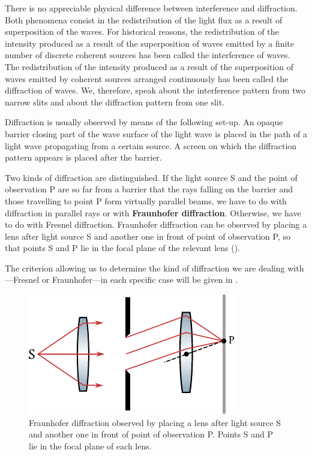 There is no appreciable physical difference between interference and diffraction.
Both phenomena consist in the redistribution of the light flux as a result of superposition of the waves.
For historical reasons, the redistribution of the intensity produced as a result of the superposition of waves emitted by a finite number of discrete coherent sources has been called the interference of waves.
The redistribution of the intensity produced as a result of the superposition of waves emitted by coherent sources arranged continuously has been called the diffraction of waves.
We, therefore, speak about the interference pattern from two narrow slits and about the diffraction pattern from one slit.

Diffraction is usually observed by means of the following set-up.
An opaque barrier closing part of the wave surface of the light wave is placed in the path of a light wave propagating from a certain source.
A screen on which the diffraction pattern appears is placed after the barrier.

Two kinds of diffraction are distinguished.
If the light source S and the point of observation P are so far from a barrier that the rays falling on the barrier and those travelling to point P form virtually parallel beams, we have to do with diffraction in parallel rays or with \textbf{Fraunhofer diffraction}.
Otherwise, we have to do with Fresnel diffraction.
Fraunhofer diffraction can be observed by placing a lens after light source S and another one in front of point of observation P, so that points S and P lie in the focal plane of the relevant lens
().

The criterion allowing us to determine the kind of diffraction we are dealing with---Fresnel or Fraunhofer---in each specific case will be given in .

\begin{figure}[!htb]
	\begin{center}
		\includegraphics[scale=1]{figures/ch_18/fig_18_1.pdf}
        \caption[]{Fraunhofer diffraction observed by placing a lens after light source S and another one in front of point of observation P. Points S and P lie in the focal plane of each lens.}
		\label{fig:18_1}
	\end{center}
	\vspace{-0.8cm}
\end{figure}

